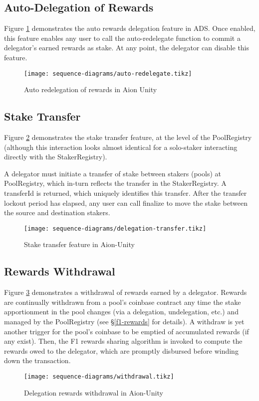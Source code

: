 \subsection{Auto-Delegation of Rewards}

Figure \ref{fig:redelegation} demonstrates the  auto rewards delegation feature in ADS. Once enabled, this feature enables any user to call the auto-redelegate function to commit a delegator's earned rewards as stake. At any point, the delegator can disable this feature. 

\begin{figure}[ht]
\centering
\texttt{[image: sequence-diagrams/auto-redelegate.tikz]}
\caption{Auto redelegation of rewards in Aion Unity}
\label{fig:redelegation}
\end{figure}
\clearpage

\subsection{Stake Transfer}

Figure \ref{fig:delegation_transfer} demonstrates the stake transfer feature, at the level of the PoolRegistry (although this interaction looks almost identical for a solo-staker interacting directly with the StakerRegistry). 

A delegator must initiate a transfer of stake between stakers (pools) at PoolRegistry, which in-turn reflects the transfer in the StakerRegistry. A transferId is returned, which uniquely identifies this transfer. After the transfer lockout period has elapsed, any user can call finalize to move the stake between the source and destination stakers.

\begin{figure}[ht]
\centering
\texttt{[image: sequence-diagrams/delegation-transfer.tikz]}
\caption{Stake transfer feature in Aion-Unity}
\label{fig:delegation_transfer}
\end{figure}
\clearpage

\subsection{Rewards Withdrawal}

Figure \ref{fig:withdrawal} demonstrates a withdrawal of rewards earned by a delegator. Rewards are continually withdrawn from a pool's coinbase contract any time the stake apportionment in the pool changes (via a delegation, undelegation, etc.) and managed by the PoolRegistry (see \S\ref{f1-rewards} for details). A withdraw is yet another trigger for the pool's coinbase to be emptied of accumulated rewards (if any exist). Then, the F1 rewards sharing algorithm is invoked to compute the rewards owed to the delegator, which are promptly disbursed before winding down the transaction. 

\begin{figure}[ht]
\centering
\texttt{[image: sequence-diagrams/withdrawal.tikz]}
\caption{Delegation rewards withdrawal in Aion-Unity}
\label{fig:withdrawal}
\end{figure}
\clearpage